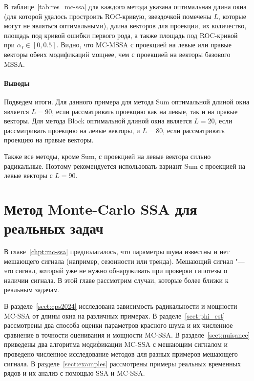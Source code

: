 \documentclass[specialist,
substylefile = spbu_report.rtx,
subf,href,colorlinks=true, 12pt]{disser}
\theoremstyle{definition}
\begin{document}
В таблице~\ref{tab:res_mc-ssa} для каждого метода указана оптимальная длина окна (для которой удалось простроить ROC-кривую, звездочкой помечены $L$, которые могут не являться оптимальными), длина векторов для проекции, их количество, площадь под кривой ошибки первого рода, а также площадь под ROC-кривой при $\alpha_I\in[0,0.5]$. Видно, что MC-MSSA с проекцией на левые или правые векторы обеих модификаций мощнее, чем с проекцией на векторы базового MSSA.
\subsubsection{Выводы}
Подведем итоги. Для данного примера для метода Sum оптимальной длиной окна является $L=90$, если рассматривать проекцию как на левые, так и на правые векторы. Для метода Block оптимальной длиной окна является $L=20$, если рассматривать проекцию на левые векторы, и $L=80$, если рассматривать проекцию на правые векторы.

Также все методы, кроме Sum, с проекцией на левые вектора сильно радикальные. Поэтому рекомендуется использовать вариант Sum с проекцией на левые векторы с $L=90$. 

\chapter{Метод Monte-Carlo SSA для реальных задач}\label{chpt:mc_ssa_real}
В главе~\ref{chpt:mc-ssa} предполагалось, что параметры шума известны и нет мешающего сигнала (например, сезонности или тренда). Мешающий сигнал "--- это сигнал, который уже не нужно обнаруживать при проверки гипотезы о наличии сигнала.  В этой главе рассмотрим случаи, которые более близки к реальным задачам.

В разделе~\ref{sect:cps2024} исследована зависимость радикальности и мощности MC-SSA от длины окна на различных примерах. В разделе~\ref{sect:phi_est} рассмотрены два способа оценки параметров красного шума и их численное сравнение в точности оценивания и мощности MC-SSA. В разделе~\ref{sect:nuisance} приведены два алгоритма модификации MC-SSA с мешающим сигналом и проведено численное исследование методов для разных примеров мешающего сигнала. В разделе~\ref{sect:examples} рассмотрены примеры реальных временных рядов и их анализ с помощью SSA и MC-SSA.

\end{document}
